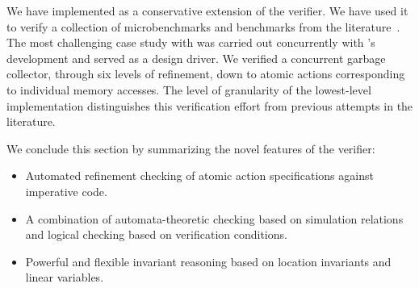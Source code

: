 We have implemented \civl as a conservative extension of the \boogie verifier.  
We have used it to verify a collection of microbenchmarks and benchmarks from the 
literature~\cite{Blumofe1999,ElmasQT09,ElmasTQ05,FarzanKP14,FlanaganQ03,Herlihy2008}. 
The most challenging case study with \civl was carried out concurrently with \civl's development and served as a design driver. 
We verified a concurrent garbage collector, through six levels of refinement, 
down to atomic actions corresponding to individual memory accesses. 
The level of granularity of the lowest-level implementation distinguishes this verification effort from previous attempts in the literature. 

We conclude this section by summarizing the novel features of the \civl verifier:
\begin{itemize}
\item Automated refinement checking of atomic action specifications against imperative code.
\item A combination of automata-theoretic checking based on simulation relations and logical checking based on verification conditions.
\item Powerful and flexible invariant reasoning based on location invariants and linear variables.
\end{itemize}
